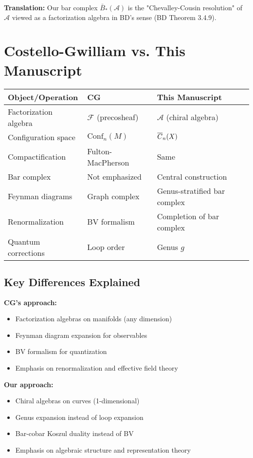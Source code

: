 \textbf{Translation:} Our bar complex $\bar{B}_*(\mathcal{A})$ is the "Chevalley-Cousin resolution" of $\mathcal{A}$ viewed as a factorization algebra in BD's sense (BD Theorem 3.4.9).

\section{Costello-Gwilliam vs. This Manuscript}

\begin{center}
\begin{tabular}{|p{6cm}|p{4cm}|p{4cm}|}
\hline
\textbf{Object/Operation} & \textbf{CG \cite{CG17}} & \textbf{This Manuscript} \\
\hline
Factorization algebra & $\mathcal{F}$ (precosheaf) & $\mathcal{A}$ (chiral algebra) \\
Configuration space & $\text{Conf}_n(M)$ & $\overline{C}_{n}(X)$ \\
Compactification & Fulton-MacPherson & Same \\
Bar complex & Not emphasized & Central construction \\
Feynman diagrams & Graph complex & Genus-stratified bar complex \\
Renormalization & BV formalism & Completion of bar complex \\
Quantum corrections & Loop order & Genus $g$ \\
\hline
\end{tabular}
\end{center}

\subsection{Key Differences Explained}

\textbf{CG's approach:}
\begin{itemize}
\item Factorization algebras on manifolds (any dimension)
\item Feynman diagram expansion for observables
\item BV formalism for quantization
\item Emphasis on renormalization and effective field theory
\end{itemize}

\textbf{Our approach:}
\begin{itemize}
\item Chiral algebras on curves (1-dimensional)
\item Genus expansion instead of loop expansion
\item Bar-cobar Koszul duality instead of BV
\item Emphasis on algebraic structure and representation theory
\end{itemize}

